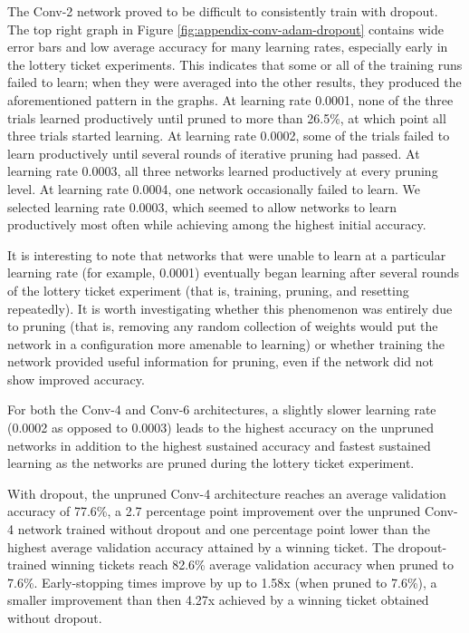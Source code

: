 The Conv-2 network proved to be difficult to consistently train with dropout. The top right graph in Figure \ref{fig:appendix-conv-adam-dropout} contains wide error bars
and low average accuracy for many learning rates, especially early in the lottery ticket experiments. This indicates that some or all of the training runs failed to learn;
when they were averaged into the other results, they produced the aforementioned pattern in the graphs. At learning rate 0.0001, none of the three trials
learned productively until pruned to more than 26.5\%, at which point all three trials started learning. At learning rate 0.0002, some of the trials failed to learn
productively until several rounds of iterative pruning had passed. At learning rate 0.0003, all three networks learned productively at every pruning level. At learning
rate 0.0004, one network occasionally failed to learn. We selected learning rate 0.0003, which seemed to allow networks to learn productively most often while
achieving among the highest initial accuracy.

It is interesting to note that networks that were unable to learn at a particular learning rate (for example, 0.0001) eventually began learning after several
rounds of the lottery ticket experiment (that is, training, pruning, and resetting repeatedly). It is worth investigating whether this phenomenon was entirely due to
pruning (that is, removing any random collection of weights would put the network in a configuration more amenable to learning) or whether training the network
provided useful information for pruning, even if the network did not show improved accuracy.

For both the Conv-4 and Conv-6 architectures, a slightly slower learning rate (0.0002 as opposed to 0.0003) leads to the highest accuracy on the
unpruned networks in addition to the highest sustained accuracy and fastest sustained learning as the networks are pruned during the lottery ticket experiment.

With dropout, the unpruned Conv-4 architecture reaches an average validation accuracy of 77.6\%, a 2.7 percentage point improvement over the unpruned
Conv-4 network trained without dropout and one percentage point lower than the highest average validation accuracy attained by a winning ticket.
The dropout-trained winning tickets reach 82.6\% average validation accuracy when pruned to 7.6\%. Early-stopping times improve by up to 1.58x (when pruned to
7.6\%), a smaller improvement than then 4.27x achieved by a winning ticket obtained without dropout.

